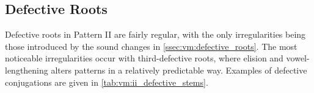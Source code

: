 \documentclass[grammar]{subfiles}
\begin{document}
\subsection{Defective Roots}
\label{ssec:vm:ii_defective}

Defective roots in Pattern II are fairly regular, with the only irregularities
being those introduced by the sound changes in \cref{ssec:vm:defective_roots}.
The most noticeable irregularities occur with third-defective roots, where
elision and vowel-lengthening alters patterns in a relatively predictable way.
Examples of defective conjugations are given in
\cref{tab:vm:ii_defective_stems}. 

\end{document}
